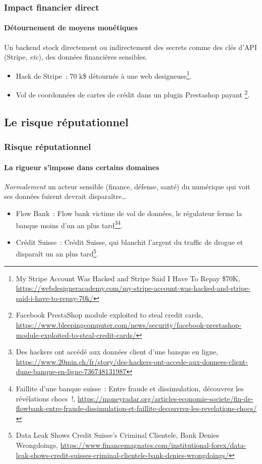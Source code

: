 \documentclass{beamer}
\begin{document}
    \begin{frame}
        \frametitle{Impact financier direct}
        \framesubtitle{Détournement de moyens monétiques}
        \transdissolve
        Un backend stock directement ou indirectement des secrets comme des clés d'API (Stripe, \textit{etc}), des données financières sensibles.
        \begin{itemize}
            \item Hack de Stripe~: 70 k\$ détournés à une web designeuse\footnote{My Stripe Account Was Hacked and Stripe Said I Have To Repay \$70K, \url{https://webdesigneracademy.com/my-stripe-account-was-hacked-and-stripe-said-i-have-to-repay-70k/}}.
            \item Vol de coordonnées de cartes de crédit dans un plugin Prestashop payant \footnote{Facebook PrestaShop module exploited to steal credit cards, \url{https://www.bleepingcomputer.com/news/security/facebook-prestashop-module-exploited-to-steal-credit-cards/}}.
        \end{itemize}
    \end{frame}

    \subsection{Le risque réputationnel}\label{subsec:risque-reputationnel}
    \begin{frame}
        \frametitle{Risque réputationnel}
        \framesubtitle{La rigueur s'impose dans certains domaines}
        \transdissolve
        \textit{Normalement} un acteur sensible (finance, défense, santé) du numérique qui voit ses données fuirent devrait disparaître\ldots
        \begin{itemize}
            \item Flow Bank~: Flow bank victime de vol de données, le régulateur ferme la banque moins d'un an plus tard\footnote{Des hackers ont accédé aux données client d’une banque en ligne, \url{https://www.20min.ch/fr/story/des-hackers-ont-accede-aux-donnees-client-dune-banque-en-ligne-736748131987}}\footnotestep\footnote{Faillite d’une banque suisse~: Entre fraude et dissimulation, découvrez les révélations chocs~!, \url{https://moneyradar.org/articles-economie-societe/fin-de-flowbank-entre-fraude-dissimulation-et-faillite-decouvrez-les-revelations-chocs/}}.
            \item Crédit Suisse~: Crédit Suisse, qui blanchit l'argent du traffic de drogue et disparaît un an plus tard\footnote{Data Leak Shows Credit Suisse’s Criminal Clientele, Bank Denies Wrongdoings, \url{https://www.financemagnates.com/institutional-forex/data-leak-shows-credit-suisses-criminal-clientele-bank-denies-wrongdoings/}}.
        \end{itemize}
    \end{frame}
\end{document}
